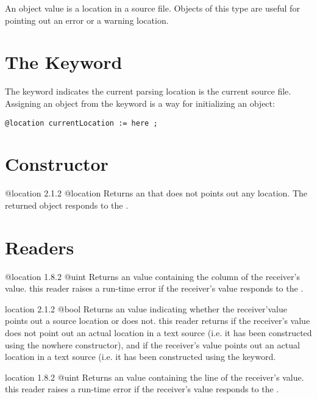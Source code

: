 

An  object value is a location in a source file. Objects of this type are useful for pointing out an error or a warning location.

\section{The  Keyword}

The  keyword indicates the current parsing location is the current source file. Assigning an  object from the  keyword is a way for initializing an  object:\newline

\texttt{@location currentLocation := here ;}

\section{Constructor}

{@location}
{2.1.2}
{@location}
{Returns an  that does not points out any location.}
{The returned object responds  to the .}

\section{Readers}

{@location}
{1.8.2}
{@uint}
{Returns an  value containing the column of the receiver's value.}
{this reader raises a run-time error if the receiver's value responds  to the .}


{location}
{2.1.2}
{@bool}
{Returns an  value indicating whether the receiver'value points out a source location or does not.}
{this reader returns  if the receiver's value does not point out an actual location in a text source (i.e. it has been constructed using the nowhere constructor), and  if the receiver's value points out an actual location in a text source (i.e. it has been constructed using the  keyword.}


{location}
{1.8.2}
{@uint}
{Returns an  value containing the line of the receiver's value.}
{this reader raises a run-time error if the receiver's value responds  to the .}


